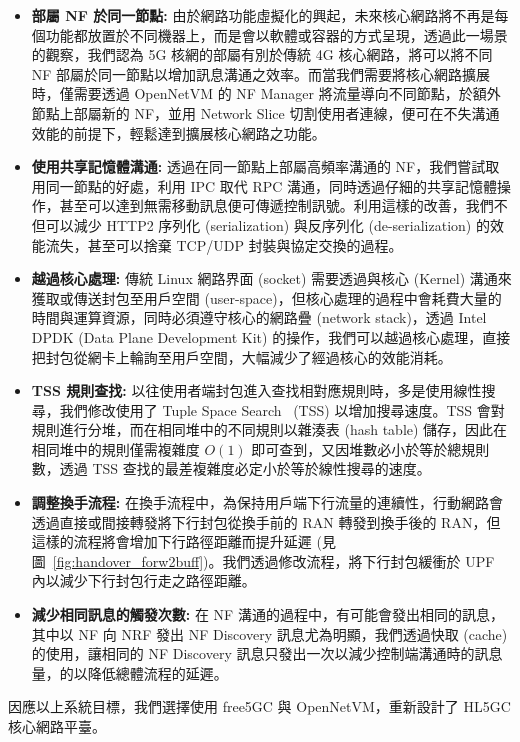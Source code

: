 \begin{itemize}
\item \textbf{部屬 NF 於同一節點:} 由於網路功能虛擬化的興起，未來核心網路將不再是每個功能都放置於不同機器上，而是會以軟體或容器的方式呈現，透過此一場景的觀察，我們認為 5G 核網的部屬有別於傳統 4G 核心網路，將可以將不同 NF 部屬於同一節點以增加訊息溝通之效率。而當我們需要將核心網路擴展時，僅需要透過 OpenNetVM 的 NF Manager 將流量導向不同節點，於額外節點上部屬新的 NF，並用 Network Slice 切割使用者連線，便可在不失溝通效能的前提下，輕鬆達到擴展核心網路之功能。
\item \textbf{使用共享記憶體溝通:} 透過在同一節點上部屬高頻率溝通的 NF，我們嘗試取用同一節點的好處，利用 IPC 取代 RPC 溝通，同時透過仔細的共享記憶體操作，甚至可以達到無需移動訊息便可傳遞控制訊號。利用這樣的改善，我們不但可以減少 HTTP2 序列化 (serialization) 與反序列化 (de-serialization) 的效能流失，甚至可以捨棄 TCP/UDP 封裝與協定交換的過程。
\item \textbf{越過核心處理:} 傳統 Linux 網路界面 (socket) 需要透過與核心 (Kernel) 溝通來獲取或傳送封包至用戶空間 (user-space)，但核心處理的過程中會耗費大量的時間與運算資源，同時必須遵守核心的網路疊 (network stack)，透過 Intel DPDK (Data Plane Development Kit) 的操作，我們可以越過核心處理，直接把封包從網卡上輪詢至用戶空間，大幅減少了經過核心的效能消耗。
\item \textbf{TSS 規則查找:} 以往使用者端封包進入查找相對應規則時，多是使用線性搜尋，我們修改使用了 Tuple Space Search~\cite{paper.TSS} (TSS) 以增加搜尋速度。TSS 會對規則進行分堆，而在相同堆中的不同規則以雜湊表 (hash table) 儲存，因此在相同堆中的規則僅需複雜度 $O(1)$ 即可查到，又因堆數必小於等於總規則數，透過 TSS 查找的最差複雜度必定小於等於線性搜尋的速度。
\item \textbf{調整換手流程:} 在換手流程中，為保持用戶端下行流量的連續性，行動網路會透過直接或間接轉發將下行封包從換手前的 RAN 轉發到換手後的 RAN，但這樣的流程將會增加下行路徑距離而提升延遲 (見圖~\ref{fig:handover_forw2buff})。我們透過修改流程，將下行封包緩衝於 UPF 內以減少下行封包行走之路徑距離。
\item \textbf{減少相同訊息的觸發次數:} 在 NF 溝通的過程中，有可能會發出相同的訊息，其中以 NF 向 NRF 發出 NF Discovery 訊息尤為明顯，我們透過快取 (cache) 的使用，讓相同的 NF Discovery 訊息只發出一次以減少控制端溝通時的訊息量，的以降低總體流程的延遲。
\end{itemize}

因應以上系統目標，我們選擇使用 free5GC 與 OpenNetVM，重新設計了 HL5GC 核心網路平臺。

